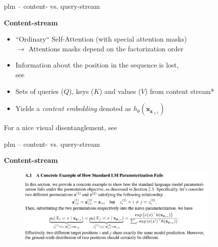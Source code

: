 
\begin{frame}{plm -- content- vs. query-stream}

\vfill

	\textbf{Content-stream}
	
	\begin{itemize}
		\item ``Ordinary`` Self-Attention (with special attention masks)\\
					$\rightarrow$ Attentions masks depend on the factorization order
		\item Information about the position in the sequence is lost,\\
					see 
		\item Sets of queries ($Q$), keys ($K$) and values ($V$) from content stream*
		\item Yields a \textit{content embedding} denoted as $h_{\theta}(\mathbf{x}_{\mathbf{z}_{\leq t}})$
	\end{itemize}
	
\vfill

	{\footnotesize *For a nice visual disentanglement, see }
	
\end{frame}


\begin{frame}{plm -- content- vs. query-stream}

\vfill

	\textbf{Content-stream}
	
	\begin{figure}
		\centering
		\includegraphics[width = 10cm]{figure/xlnet-a1.png}\\ 
	\end{figure}
	
\vfill

\end{frame}

